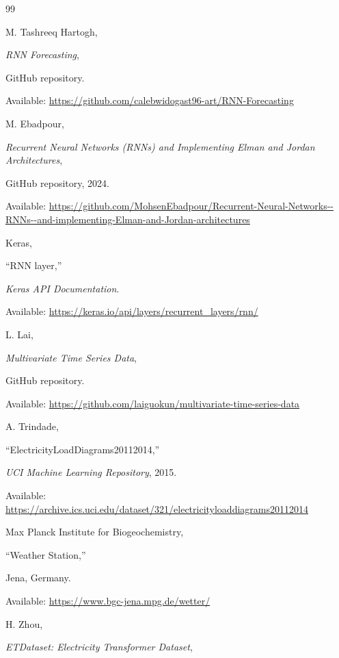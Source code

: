 \documentclass[conference]{IEEEtran}
\begin{document}
\begin{thebibliography}{99}


M. Tashreeq Hartogh,

\textit{RNN Forecasting},

GitHub repository.

Available: \url{https://github.com/calebwidogast96-art/RNN-Forecasting}


M. Ebadpour,

\textit{Recurrent Neural Networks (RNNs) and Implementing Elman and Jordan Architectures},

GitHub repository, 2024.

Available: \url{https://github.com/MohsenEbadpour/Recurrent-Neural-Networks--RNNs--and-implementing-Elman-and-Jordan-architectures}



Keras,

``RNN layer,''

\textit{Keras API Documentation}.

Available: \url{https://keras.io/api/layers/recurrent_layers/rnn/}



L. Lai,

\textit{Multivariate Time Series Data},

GitHub repository.

Available: \url{https://github.com/laiguokun/multivariate-time-series-data}



A. Trindade,

``ElectricityLoadDiagrams20112014,''

\textit{UCI Machine Learning Repository}, 2015.

Available: \url{https://archive.ics.uci.edu/dataset/321/electricityloaddiagrams20112014}



Max Planck Institute for Biogeochemistry,

``Weather Station,''

Jena, Germany.

Available: \url{https://www.bgc-jena.mpg.de/wetter/}



H. Zhou,

\textit{ETDataset: Electricity Transformer Dataset},


\end{thebibliography}
\end{document}
